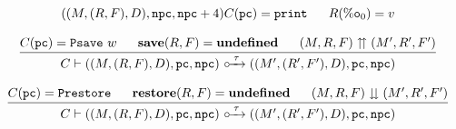 \begin{figure}[!t]
{\begin{minipage}[b]{1\textwidth}
\[\begin{array}{c}
{                        {((\Mem, (\RFile, \Wstack), \DBuf), \npc, \npc + 4)}
                }
                {
                    \code(\pc) = \cprint \quad \ \ \RFile(\oreg{0}) = \val
                } \\
                \\
                \infer
                {
                    \llocalstep{\code}
                        {((\Mem, (\RFile, \Wstack), \DBuf), \pc, \npc)}
                        { \, \empmsg \, }
                        {((\Mem', (\RFile', \Wstack'), \DBuf), \pc, \npc)}
                }
                {
                    \code(\pc) = \Psave \ \word \quad \ \ 
                    \decwin{(\RFile, \Wstack)} = \undef \quad \ \ 
                    \winOverFlow{(\Mem, \RFile, \Wstack)}
                        {(\Mem', \RFile', \Wstack')}
                } \\
                \\
                \infer
                {
                    \llocalstep{\code}
                        {((\Mem, (\RFile, \Wstack), \DBuf), \pc, \npc)}
                        { \, \empmsg \, }
                        {((\Mem', (\RFile', \Wstack'), \DBuf), \pc, \npc)}
                }
                {
                    \code(\pc) = \Prestore \quad \ \ 
                    \incwin{(\RFile, \Wstack)} = \undef \quad \ \ 
                    \winUnderFlow{(\Mem, \RFile, \Wstack)}
                        {(\Mem', \RFile', \Wstack')}
                }
            \end{array}
        \]
        \vspace{0.2em}
        \end{minipage}
    }


\end{figure}
